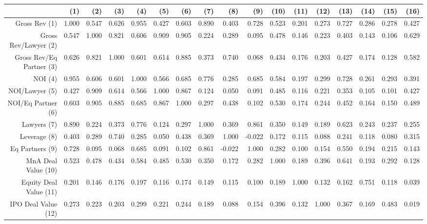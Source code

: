 \begin{table}[ht]
\centering
\begin{tabular}{rrrrrrrrrrrrrrrrr}
  \hline
 & (1) & (2) & (3) & (4) & (5) & (6) & (7) & (8) & (9) & (10) & (11) & (12) & (13) & (14) & (15) & (16) \\ 
  \hline
Gross Rev (1) & 1.000 & 0.547 & 0.626 & 0.955 & 0.427 & 0.603 & 0.890 & 0.403 & 0.728 & 0.523 & 0.201 & 0.273 & 0.727 & 0.286 & 0.278 & 0.427 \\ 
  Gross Rev/Lawyer (2) & 0.547 & 1.000 & 0.821 & 0.606 & 0.909 & 0.905 & 0.224 & 0.289 & 0.095 & 0.478 & 0.146 & 0.223 & 0.403 & 0.143 & 0.106 & 0.629 \\ 
  Gross Rev/Eq Partner (3) & 0.626 & 0.821 & 1.000 & 0.601 & 0.614 & 0.885 & 0.373 & 0.740 & 0.068 & 0.434 & 0.176 & 0.203 & 0.427 & 0.174 & 0.128 & 0.582 \\ 
  NOI (4) & 0.955 & 0.606 & 0.601 & 1.000 & 0.566 & 0.685 & 0.776 & 0.285 & 0.685 & 0.584 & 0.197 & 0.299 & 0.728 & 0.261 & 0.293 & 0.391 \\ 
  NOI/Lawyer (5) & 0.427 & 0.909 & 0.614 & 0.566 & 1.000 & 0.867 & 0.124 & 0.050 & 0.091 & 0.485 & 0.116 & 0.221 & 0.353 & 0.105 & 0.101 & 0.427 \\ 
  NOI/Eq Partner (6) & 0.603 & 0.905 & 0.885 & 0.685 & 0.867 & 1.000 & 0.297 & 0.438 & 0.102 & 0.530 & 0.174 & 0.244 & 0.452 & 0.164 & 0.150 & 0.489 \\ 
  Lawyers (7) & 0.890 & 0.224 & 0.373 & 0.776 & 0.124 & 0.297 & 1.000 & 0.369 & 0.861 & 0.350 & 0.149 & 0.189 & 0.623 & 0.243 & 0.237 & 0.255 \\ 
  Leverage (8) & 0.403 & 0.289 & 0.740 & 0.285 & 0.050 & 0.438 & 0.369 & 1.000 & -0.022 & 0.172 & 0.115 & 0.088 & 0.241 & 0.118 & 0.080 & 0.315 \\ 
  Eq Partners (9) & 0.728 & 0.095 & 0.068 & 0.685 & 0.091 & 0.102 & 0.861 & -0.022 & 1.000 & 0.282 & 0.100 & 0.154 & 0.550 & 0.194 & 0.215 & 0.143 \\ 
  MnA Deal Value (10) & 0.523 & 0.478 & 0.434 & 0.584 & 0.485 & 0.530 & 0.350 & 0.172 & 0.282 & 1.000 & 0.189 & 0.396 & 0.641 & 0.193 & 0.292 & 0.128 \\ 
  Equity Deal Value (11) & 0.201 & 0.146 & 0.176 & 0.197 & 0.116 & 0.174 & 0.149 & 0.115 & 0.100 & 0.189 & 1.000 & 0.132 & 0.162 & 0.751 & 0.118 & 0.039 \\ 
  IPO Deal Value (12) & 0.273 & 0.223 & 0.203 & 0.299 & 0.221 & 0.244 & 0.189 & 0.088 & 0.154 & 0.396 & 0.132 & 1.000 & 0.367 & 0.169 & 0.483 & 0.019 \\ 

\end{tabular}
\end{table}
